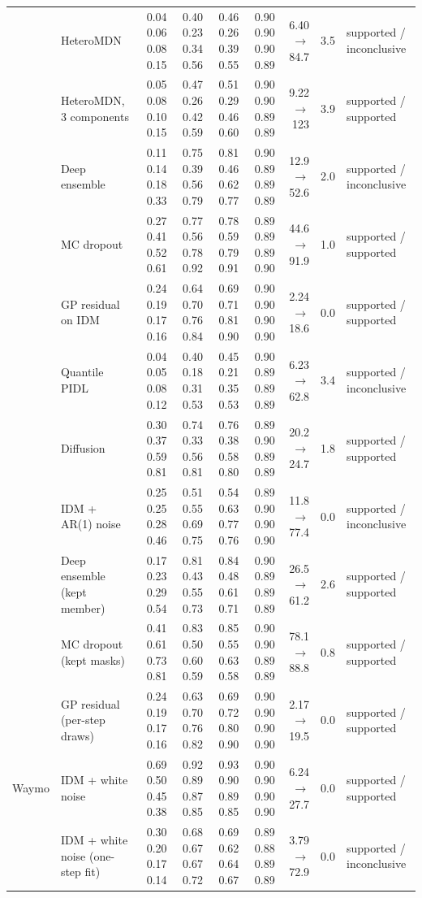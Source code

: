 \begin{longtable}{llrrrrrrl}
 & HeteroMDN & 0.04 0.06 0.08 0.15 & 0.40 0.23 0.34 0.56 & 0.46 0.26 0.39 0.55 & 0.90 0.90 0.90 0.89 & 6.40 $\rightarrow$ 84.7 & 3.5 & supported / inconclusive \\
 & HeteroMDN, 3 components & 0.05 0.08 0.10 0.15 & 0.47 0.26 0.42 0.59 & 0.51 0.29 0.46 0.60 & 0.90 0.90 0.89 0.89 & 9.22 $\rightarrow$ 123 & 3.9 & supported / supported \\
 & Deep ensemble & 0.11 0.14 0.18 0.33 & 0.75 0.39 0.56 0.79 & 0.81 0.46 0.62 0.77 & 0.90 0.89 0.89 0.89 & 12.9 $\rightarrow$ 52.6 & 2.0 & supported / inconclusive \\
 & MC dropout & 0.27 0.41 0.52 0.61 & 0.77 0.56 0.78 0.92 & 0.78 0.59 0.79 0.91 & 0.89 0.89 0.89 0.90 & 44.6 $\rightarrow$ 91.9 & 1.0 & supported / supported \\
 & GP residual on IDM & 0.24 0.19 0.17 0.16 & 0.64 0.70 0.76 0.84 & 0.69 0.71 0.81 0.90 & 0.90 0.90 0.90 0.90 & 2.24 $\rightarrow$ 18.6 & 0.0 & supported / supported \\
 & Quantile PIDL & 0.04 0.05 0.08 0.12 & 0.40 0.18 0.31 0.53 & 0.45 0.21 0.35 0.53 & 0.90 0.89 0.89 0.89 & 6.23 $\rightarrow$ 62.8 & 3.4 & supported / inconclusive \\
 & Diffusion & 0.30 0.37 0.59 0.81 & 0.74 0.33 0.56 0.81 & 0.76 0.38 0.58 0.80 & 0.89 0.90 0.89 0.89 & 20.2 $\rightarrow$ 24.7 & 1.8 & supported / supported \\
 & IDM + AR(1) noise & 0.25 0.25 0.28 0.46 & 0.51 0.55 0.69 0.75 & 0.54 0.63 0.77 0.76 & 0.89 0.90 0.90 0.90 & 11.8 $\rightarrow$ 77.4 & 0.0 & supported / inconclusive \\
 & Deep ensemble (kept member) & 0.17 0.23 0.29 0.54 & 0.81 0.43 0.55 0.73 & 0.84 0.48 0.61 0.71 & 0.90 0.89 0.89 0.89 & 26.5 $\rightarrow$ 61.2 & 2.6 & supported / supported \\
 & MC dropout (kept masks) & 0.41 0.61 0.73 0.81 & 0.83 0.50 0.60 0.59 & 0.85 0.55 0.63 0.58 & 0.90 0.90 0.89 0.89 & 78.1 $\rightarrow$ 88.8 & 0.8 & supported / supported \\
 & GP residual (per-step draws) & 0.24 0.19 0.17 0.16 & 0.63 0.70 0.76 0.82 & 0.69 0.72 0.80 0.90 & 0.90 0.90 0.90 0.90 & 2.17 $\rightarrow$ 19.5 & 0.0 & supported / supported \\
\midrule
Waymo & IDM + white noise & 0.69 0.50 0.45 0.38 & 0.92 0.89 0.87 0.85 & 0.93 0.90 0.89 0.85 & 0.90 0.90 0.90 0.90 & 6.24 $\rightarrow$ 27.7 & 0.0 & supported / supported \\
 & IDM + white noise (one-step fit) & 0.30 0.20 0.17 0.14 & 0.68 0.67 0.67 0.72 & 0.69 0.62 0.64 0.67 & 0.89 0.88 0.89 0.89 & 3.79 $\rightarrow$ 72.9 & 0.0 & supported / inconclusive \\

\end{longtable}
